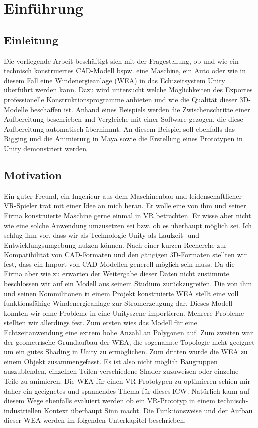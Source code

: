 \chapter{Einführung}
\section{Einleitung}

Die vorliegende Arbeit beschäftigt sich mit der Fragestellung, ob und wie ein technisch konstruiertes CAD-Modell bspw. eine Maschine, ein Auto oder wie in diesem Fall eine Windenergieanlage (WEA) in das Echtzeitsystem Unity überführt werden kann. Dazu wird untersucht welche Möglichkeiten des Exportes professionelle Konstruktionsprogramme anbieten und wie die Qualität dieser 3D-Modelle beschaffen ist. Anhand eines Beispiels werden die Zwischenschritte einer Aufbereitung beschrieben und Vergleiche mit einer Software gezogen, die diese Aufbereitung automatisch übernimmt. An diesem Beispiel soll ebenfalls das Rigging und die Animierung in Maya sowie die Erstellung eines Prototypen in Unity demonstriert werden. 

\newpage
\section{Motivation}

Ein guter Freund, ein Ingenieur aus dem Maschinenbau und leidenschaftlicher VR-Spieler trat mit einer Idee an mich heran. Er wolle eine von ihm und seiner Firma konstruierte Maschine gerne einmal in VR betrachten. Er wisse aber nicht wie eine solche Anwendung umzusetzen sei bzw. ob es überhaupt möglich sei. Ich schlug ihm vor, dass wir als Technologie Unity als Laufzeit- und Entwicklungsumgebung nutzen können. Nach einer kurzen Recherche  zur Kompatibilität von CAD-Formaten und den gängigen 3D-Formaten stellten wir fest, dass ein Import von CAD-Modellen generell möglich sein muss. Da die Firma aber wie zu erwarten der Weitergabe dieser Daten nicht zustimmte beschlossen wir auf ein Modell aus seinem Studium zurückzugreifen. Die von ihm und seinen Kommilitonen in einem Projekt konstruierte WEA stellt eine voll funktionsfähige Windenergieanlage zur Stromerzeugung dar. Dieses Modell konnten wir ohne Probleme in eine Unityszene importieren. Mehrere Probleme stellten wir allerdings fest. Zum ersten wies das Modell für eine Echtzeitanwendung eine extrem hohe  Anzahl an Polygonen auf. Zum zweiten war der geometrische Grundaufbau der WEA, die sogenannte Topologie nicht geeignet um ein gutes Shading in Unity zu ermöglichen. Zum dritten wurde die WEA zu einem Objekt zusammengefasst. Es ist also nicht möglich Baugruppen auszublenden, einzelnen Teilen verschiedene Shader zuzuweisen oder einzelne Teile zu animieren. Die WEA für einen VR-Prototypen zu optimieren schien mir daher ein geeignetes und spannendes Thema für dieses ICW. Natürlich kann auf diesem Wege ebenfalls evaluiert werden ob ein VR-Prototyp in einem technisch-industriellen Kontext überhaupt Sinn macht.  Die Funktionsweise und der Aufbau dieser WEA werden im folgenden Unterkapitel  beschrieben.

